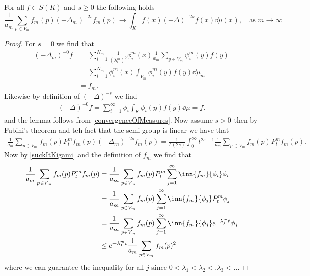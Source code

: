 \begin{lemma}\label{convergence}
	For all $f \in S(K)$ and $s \geq 0$ the following holds
	\begin{equation}
		\frac{1}{a_m} \sum_{p \in V_m} f_m(p) (-\Delta_m)^{-2s}f_m(p) \to \int_{K}f(x)(-\Delta)^{-2s}f(x) \dd \mu(x), \quad \text{as } m \to \infty
	\end{equation}
\end{lemma}
\begin{proof}
	For $s = 0$  we find that 
	\begin{align}
		(-\Delta_m)^{-0} f&= \sum_{i = 1}^{N_m} \frac{1}{(\lambda_i^{m})^{0}} \phi_{i}^{m}(x) \frac{1}{a_m} \sum_{y \in V_m} \psi_{i}^{m}(y) f(y) \\
		&= \sum_{i = 1}^{N_m} \phi_{i}^{m}(x) \int_{V_m} \phi_i^{m}(y)f(y) \dd \mu_{m} \\
		& = f_m.
	\end{align}
	Likewise by definition of $(-\Delta)^{-s}$ we find
	\begin{align}
		(-\Delta)^{-0} f = \sum_{i = 1}^{\infty} \phi_{i} \int_{K} \phi_i(y) f(y) \dd \mu = f.
	\end{align}
	and the lemma follows from \cref{convergenceOfMeasures}. Now assume $s > 0$ then by Fubini's theorem and teh fact that the semi-group is linear we have that
	\begin{align}
		\frac{1}{a_m} \sum_{p \in V_m} f_m(p) P_t^{m} f_m(p) (-\Delta_{m})^{-2s}f_m(p)  = \frac{1}{\Gamma(2s)} \int_{0}^{\infty} t^{2s-1} \frac{1}{a_m} \sum_{p \in V_m} f_m(p) P_{t}^{m} f_m(p).
	\end{align}
	Now by \cref{suckItKigami} and the definition of $f_m$ we find that
	\begin{align}
		\frac{1}{a_m} \sum_{p \in V_m} f_m(p) P_{t}^{m} f_m(p) &= \frac{1}{a_m} \sum_{p \in V_m} f_m(p) P_{t}^{m} \sum_{j =1}^{\infty} \inn{f_m}{\phi_i} \phi_{i} \\
		&= \frac{1}{a_m} \sum_{p \in V_m} f_m(p) \sum_{j =1}^{\infty} \inn{f_m}{\phi_j} P_{t}^{m} \phi_{j} \\
		& = \frac{1}{a_m} \sum_{p \in V_m} f_m(p) \sum_{j =1}^{\infty} \inn{f_m}{\phi_j} e^{-\lambda_{j}^{m} t} \phi_{j} \\
		&\leq e^{-\lambda_1^{m}t} \frac{1}{a_m} \sum_{p \in V_m} f_m(p)^2
	\end{align}
	where we can guarantee the inequality for all $j$ since $0 < \lambda_1 < \lambda_2 < .\lambda_3 <..$. 
	

\end{proof}
